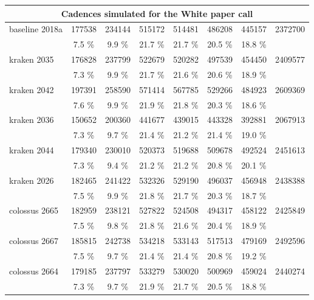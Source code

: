 \begin{appendices}
\begin{longtable}{l|ccccccc}
  \hline
  \hline
  \multicolumn{8}{c}{Cadences simulated for the White paper call}\\
  \hline      
      baseline 2018a &  177538 &  234144 &  515172 &  514481 &  486208 &  445157 &  2372700 \\ 
                     &    7.5 \% &    9.9 \% &   21.7 \% &   21.7 \% &   20.5 \% &   18.8 \% & \\
\hline
         kraken 2035 &  176828 &  237799 &  522679 &  520282 &  497539 &  454450 &  2409577 \\ 
                     &    7.3 \% &    9.9 \% &   21.7 \% &   21.6 \% &   20.6 \% &   18.9 \% & \\
\hline         
         kraken 2042 &  197391 &  258590 &  571414 &  567785 &  529266 &  484923 &  2609369 \\ 
                     &    7.6 \% &    9.9 \% &   21.9 \% &   21.8 \% &   20.3 \% &   18.6 \% & \\
\hline
         kraken 2036 &  150652 &  200360 &  441677 &  439015 &  443328 &  392881 &  2067913 \\ 
                     &    7.3 \% &    9.7 \% &   21.4 \% &   21.2 \% &   21.4 \% &   19.0 \% & \\
\hline
         kraken 2044 &  179340 &  230010 &  520373 &  519688 &  509678 &  492524 &  2451613 \\ 
                     &    7.3 \% &    9.4 \% &   21.2 \% &   21.2 \% &   20.8 \% &   20.1 \% & \\
\hline
         kraken 2026 &  182465 &  241422 &  532326 &  529190 &  496037 &  456948 &  2438388 \\ 
                     &    7.5 \% &    9.9 \% &   21.8 \% &   21.7 \% &   20.3 \% &   18.7 \% & \\
\hline
       colossus 2665 &  182959 &  238121 &  527822 &  524508 &  494317 &  458122 &  2425849 \\ 
                     &    7.5 \% &    9.8 \% &   21.8 \% &   21.6 \% &   20.4 \% &   18.9 \% & \\
\hline
       colossus 2667 &  185815 &  242738 &  534218 &  533143 &  517513 &  479169 &  2492596 \\ 
                     &    7.5 \% &    9.7 \% &   21.4 \% &   21.4 \% &   20.8 \% &   19.2 \% & \\
\hline
       colossus 2664 &  179185 &  237797 &  533279 &  530020 &  500969 &  459024 &  2440274 \\ 
                     &    7.3 \% &    9.7 \% &   21.9 \% &   21.7 \% &   20.5 \% &   18.8 \% & \\

\end{longtable}
\end{appendices}
